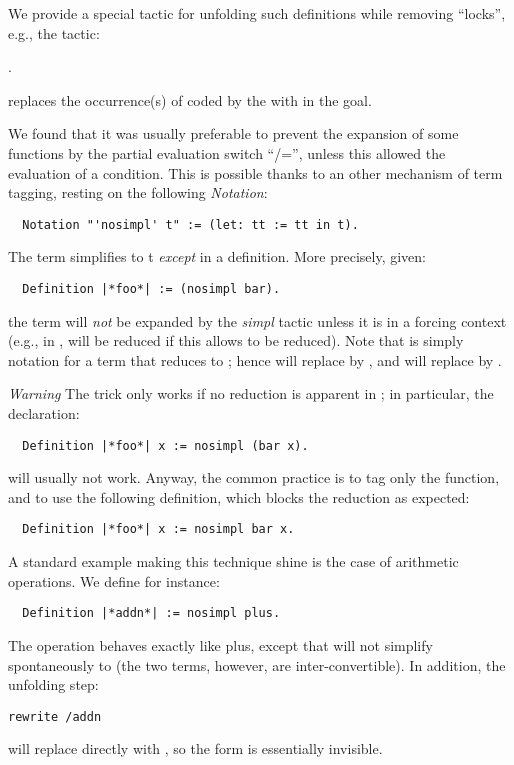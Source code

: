 We provide a special tactic  for unfolding such definitions
while removing ``locks'', e.g., the tactic:

   .

replaces the occurrence(s) of  coded by the 
with  in the goal.

We found that it was usually preferable to prevent the expansion of
some functions by the partial evaluation switch ``/='', unless
this allowed the evaluation of a condition. This is possible thanks to
an other mechanism of term tagging, resting on the following
\emph{Notation}:
\begin{lstlisting}
  Notation "'nosimpl' t" := (let: tt := tt in t).
\end{lstlisting}

The term  simplifies to t \emph{except} in a
definition. More precisely,
given:
\begin{lstlisting}
  Definition |*foo*| := (nosimpl bar).
\end{lstlisting}
the term  will \emph{not} be expanded by the
\emph{simpl} tactic unless it is in a forcing context (e.g., in
,  will be reduced if this allows
 to be reduced). Note that  is simply notation
for a term that reduces to ; hence  will replace
     by , and  will replace  by
    .

\emph{Warning} The  trick only works if no reduction is
apparent in ; in particular, the declaration:
\begin{lstlisting}
  Definition |*foo*| x := nosimpl (bar x).
\end{lstlisting}
will usually not work. Anyway, the common practice is to tag only the
function, and to use the following definition, which blocks the
reduction as expected:
\begin{lstlisting}
  Definition |*foo*| x := nosimpl bar x.
\end{lstlisting}


A standard example making this technique shine is the case of
arithmetic operations. We define for instance:
\begin{lstlisting}
  Definition |*addn*| := nosimpl plus.
\end{lstlisting}
The operation  behaves exactly like plus, except that
 will not
simplify spontaneously to  (the two terms, however, are
inter-convertible). In addition, the unfolding step:
\begin{lstlisting}
rewrite /addn
\end{lstlisting}
will replace  directly with , so the  form
is essentially invisible.

